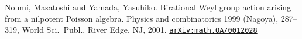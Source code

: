 \documentclass[12pt,twoside]{article}
\newcommand\arxivref[1]{\href{http://arxiv.org/abs/#1}{\tt arXiv:#1}}
\theoremstyle{plain} %
\theoremstyle{definition} %
\theoremstyle{definition} %
\numberwithin{theorem}{section}
\numberwithin{equation}{section}
\numberwithin{figure}{section}
\numberwithin{table}{section}
\begin{document}
\begin{thebibliography}{99}
%
%
%
%

Noumi, Masatoshi and Yamada, Yasuhiko.
Birational Weyl group action arising from a nilpotent Poisson algebra. 
Physics and combinatorics 1999 (Nagoya), 287--319, 
World Sci.\ Publ., River Edge, NJ, 2001. 
\arxivref{math.QA/0012028}

%



\end{thebibliography}
\end{document}
